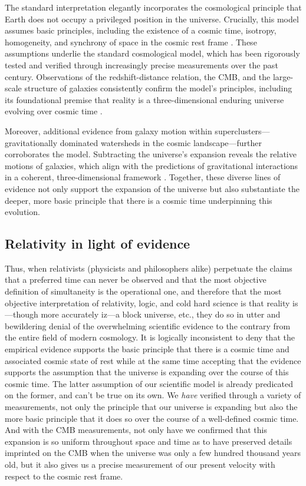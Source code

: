 \documentclass[aps,rmp,groupedaddress,twocolumn,10pt]{revtex4-2}
\begin{document}
The standard interpretation elegantly incorporates the cosmological principle that Earth does not occupy a privileged position in the universe. Crucially, this model assumes basic principles, including the existence of a cosmic time, isotropy, homogeneity, and synchrony of space in the cosmic rest frame \cite{Robertson1933}. These assumptions underlie the standard cosmological model, which has been rigorously tested and verified through increasingly precise measurements over the past century. Observations of the redshift-distance relation, the CMB, and the large-scale structure of galaxies consistently confirm the model's principles, including its foundational premise that reality is a three-dimensional enduring universe evolving over cosmic time \cite{Aghanim2020a,Riess2023}.

Moreover, additional evidence from galaxy motion within superclusters---gravitationally dominated watersheds in the cosmic landscape---further corroborates the model. Subtracting the universe's expansion reveals the relative motions of galaxies, which align with the predictions of gravitational interactions in a coherent, three-dimensional framework \cite{Tully2014}. Together, these diverse lines of evidence not only support the expansion of the universe but also substantiate the deeper, more basic principle that there is a cosmic time underpinning this evolution.

\subsection{Relativity in light of evidence}

Thus, when relativists (physicists and philosophers alike) perpetuate the claims that a preferred time can never be observed and that the most objective definition of simultaneity is the operational one, and therefore that the most objective interpretation of relativity, logic, and cold hard science is that reality is---though more accurately iz---a block universe, etc., they do so in utter and bewildering denial of the overwhelming scientific evidence to the contrary from the entire field of modern cosmology. It is logically inconsistent to deny that the empirical evidence supports the basic principle that there is a cosmic time and associated cosmic state of rest while at the same time accepting that the evidence supports the assumption that the universe is expanding over the course of this cosmic time. The latter assumption of our scientific model is already predicated on the former, and can't be true on its own. We \textit{have} verified through a variety of measurements, not only the principle that our universe is expanding but also the more basic principle that it does so over the course of a well-defined cosmic time. And with the CMB measurements, not only have we confirmed that this expansion is so uniform throughout space and time as to have preserved details imprinted on the CMB when the universe was only a few hundred thousand years old, but it also gives us a precise measurement of our present velocity with respect to the cosmic rest frame. 
\end{document}
